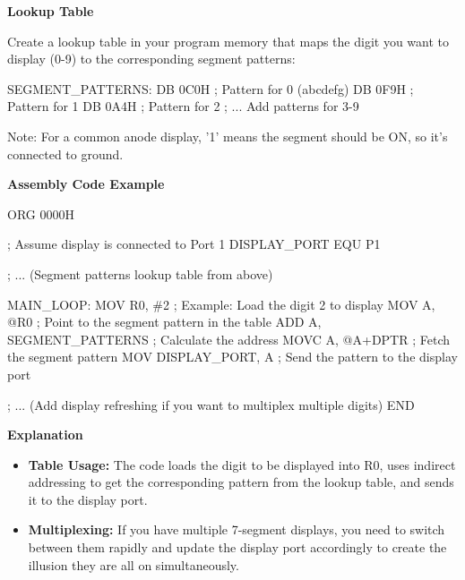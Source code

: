 \documentclass[
]{article}
\newenvironment{Shaded}{}{}
\newcommand{\NormalTok}[1]{#1}
\begin{document}
\textbf{Lookup Table}

Create a lookup table in your program memory that maps the digit you
want to display (0-9) to the corresponding segment patterns:

\begin{Shaded}
\begin{Highlighting}[]
\NormalTok{SEGMENT\_PATTERNS:}
\NormalTok{    DB 0C0H ; Pattern for 0 (abcdefg)}
\NormalTok{    DB 0F9H ; Pattern for 1}
\NormalTok{    DB 0A4H ; Pattern for 2}
\NormalTok{     ; ... Add patterns for 3{-}9}
\end{Highlighting}
\end{Shaded}

Note: For a common anode display, '1' means the segment should be ON, so
it's connected to ground.

\textbf{Assembly Code Example}

\begin{Shaded}
\begin{Highlighting}[]
\NormalTok{ORG 0000H}

\NormalTok{; Assume display is connected to Port 1}
\NormalTok{DISPLAY\_PORT EQU P1}

\NormalTok{; ... (Segment patterns lookup table from above)}

\NormalTok{MAIN\_LOOP:}
\NormalTok{    MOV R0, \#2   ; Example: Load the digit 2 to display}
\NormalTok{    MOV A, @R0   ; Point to the segment pattern in the table}
\NormalTok{    ADD A, SEGMENT\_PATTERNS  ; Calculate the address}
\NormalTok{    MOVC A, @A+DPTR          ; Fetch the segment pattern}
\NormalTok{    MOV DISPLAY\_PORT, A      ;  Send the pattern to the display port}

\NormalTok{    ; ... (Add display refreshing if you want to multiplex multiple digits)}
\NormalTok{END}
\end{Highlighting}
\end{Shaded}

\textbf{Explanation}

\begin{itemize}
\item
  \textbf{Table Usage:} The code loads the digit to be displayed into
  R0, uses indirect addressing to get the corresponding pattern from the
  lookup table, and sends it to the display port.
\item
  \textbf{Multiplexing:} If you have multiple 7-segment displays, you
  need to switch between them rapidly and update the display port
  accordingly to create the illusion they are all on simultaneously.
\end{itemize}
\end{document}
